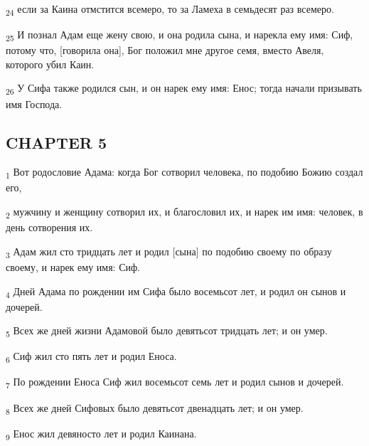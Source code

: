 \begin{tcolorbox}
\textsubscript{24} если за Каина отмстится всемеро, то за Ламеха в семьдесят раз всемеро.
\end{tcolorbox}
\begin{tcolorbox}
\textsubscript{25} И познал Адам еще жену свою, и она родила сына, и нарекла ему имя: Сиф, потому что, [говорила она], Бог положил мне другое семя, вместо Авеля, которого убил Каин.
\end{tcolorbox}
\begin{tcolorbox}
\textsubscript{26} У Сифа также родился сын, и он нарек ему имя: Енос; тогда начали призывать имя Господа.
\end{tcolorbox}
\subsection{CHAPTER 5}
\begin{tcolorbox}
\textsubscript{1} Вот родословие Адама: когда Бог сотворил человека, по подобию Божию создал его,
\end{tcolorbox}
\begin{tcolorbox}
\textsubscript{2} мужчину и женщину сотворил их, и благословил их, и нарек им имя: человек, в день сотворения их.
\end{tcolorbox}
\begin{tcolorbox}
\textsubscript{3} Адам жил сто тридцать лет и родил [сына] по подобию своему по образу своему, и нарек ему имя: Сиф.
\end{tcolorbox}
\begin{tcolorbox}
\textsubscript{4} Дней Адама по рождении им Сифа было восемьсот лет, и родил он сынов и дочерей.
\end{tcolorbox}
\begin{tcolorbox}
\textsubscript{5} Всех же дней жизни Адамовой было девятьсот тридцать лет; и он умер.
\end{tcolorbox}
\begin{tcolorbox}
\textsubscript{6} Сиф жил сто пять лет и родил Еноса.
\end{tcolorbox}
\begin{tcolorbox}
\textsubscript{7} По рождении Еноса Сиф жил восемьсот семь лет и родил сынов и дочерей.
\end{tcolorbox}
\begin{tcolorbox}
\textsubscript{8} Всех же дней Сифовых было девятьсот двенадцать лет; и он умер.
\end{tcolorbox}
\begin{tcolorbox}
\textsubscript{9} Енос жил девяносто лет и родил Каинана.
\end{tcolorbox}
